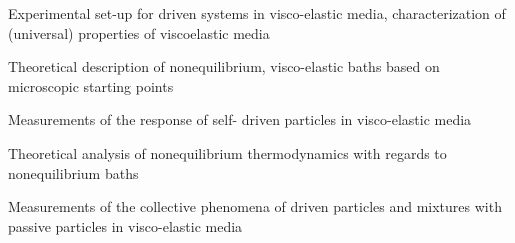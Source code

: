\begin{workpackage}
\begin{tasklist}
\end{tasklist}

\begin{wpdelivs}
  \begin{wpdeliv}[due=24,id=brown-d1,dissem=PU,nature=DEM,lead=USTUTT,miles=data1]
      {Experimental set-up for driven systems in visco-elastic media, characterization of (universal) properties of viscoelastic media}
  \end{wpdeliv}
  \begin{wpdeliv}[due=24,id=brown-d2,dissem=PU,nature=DEM,lead=USTUTT,miles=data1]
      {Theoretical description of nonequilibrium, visco-elastic baths based on microscopic starting points}
\end{wpdeliv}
 
  \begin{wpdeliv}[due=48,id=brown-d3,dissem=PU,nature=DEM,lead=USTUTT,miles=final]
       {Measurements of the response of self- driven particles in visco-elastic media}
 \end{wpdeliv}
\begin{wpdeliv}[due=48,id=brown-d4,dissem=PU,nature=DEM,lead=USTUTT,miles=final]
      {Theoretical analysis of nonequilibrium thermodynamics with regards to nonequilibrium baths}
\end{wpdeliv}
 \begin{wpdeliv}[due=48,id=brown-d5,dissem=PU,nature=DEM,lead=USTUTT,miles=final]
      {Measurements of the collective phenomena of driven particles and mixtures with passive particles in visco-elastic media}
\end{wpdeliv}
\end{wpdelivs}

\end{workpackage}
